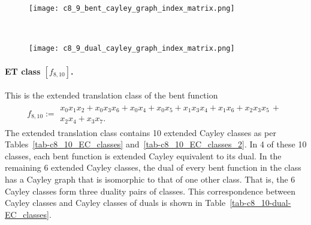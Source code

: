 \documentclass[12pt,a4paper]{article}
\begin{document}
\begin{figure}[!bhpt] %
\centering
\begin{minipage}{.48\textwidth}
  \centering
  \texttt{[image: c8\_9\_bent\_cayley\_graph\_index\_matrix.png]}
  \label{fig:c8_9_bent_cayley_graph_index_matrix}
\end{minipage}
~~
\begin{minipage}{.48\textwidth}
  \centering
  \texttt{[image: c8\_9\_dual\_cayley\_graph\_index\_matrix.png]}
  \label{fig:c8_9_dual_cayley_graph_index_matrix}
\end{minipage}%
\end{figure}
\newpage
\paragraph*{ET class $[f_{8,10}]$.}
%
This is the extended translation class of the bent function
\small{}
\begin{align*}
f_{ 8 , 10 } :=
\begin{array}{l}
x_{0} x_{1} x_{2} + x_{0} x_{3} x_{6} + x_{0} x_{4} + x_{0} x_{5} + x_{1} x_{3} x_{4} + x_{1} x_{6}
+ x_{2} x_{3} x_{5}\, +
\\
x_{2} x_{4} + x_{3} x_{7}.
\end{array}
\end{align*}
\normalsize{}
The extended translation class contains 10 extended Cayley classes as per
Tables~\ref{tab-c8_10_EC_classes} and~\ref{tab-c8_10_EC_classes_2}.
In 4 of these 10 classes, each bent function is extended Cayley equivalent to its dual.
In the remaining 6 extended Cayley classes, the dual of every bent function in the class has a Cayley graph
that is isomorphic to that of one other class. That is, the 6 Cayley classes form three duality pairs of classes.
This correspondence between Cayley classes and Cayley classes of duals is shown in Table~\ref{tab-c8_10-dual-EC_classes}.
\end{document}
